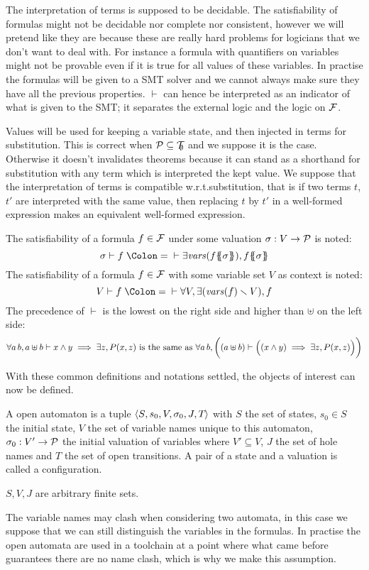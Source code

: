 \documentclass{article}
\begin{document}
The interpretation of terms is supposed to be decidable.
The satisfiability of formulas might not be decidable nor complete nor consistent, however we will pretend like they are because these are really hard problems for logicians that we don't want to deal with.
For instance a formula with quantifiers on variables might not be provable even if it is true for all values of these variables.
In practise the formulas will be given to a SMT solver and we cannot always make sure they have all the previous properties.
\(\vdash\) can hence be interpreted as an indicator of what is given to the SMT; it separates the external logic and the logic on \({\mathcal{F}}\).

Values will be used for keeping a variable state, and then injected in terms for substitution.
This is correct when \(\mathcal{P} \subseteq {\mathcal{T}}_{\!\!\emptyset}\) and we suppose it is the case.
Otherwise it doesn't invalidates theorems because it can stand as a shorthand for substitution with any term which is interpreted the kept value.
We suppose that the interpretation of terms is compatible w.r.t.\@ substitution, that is if two terms \(t\), \(t'\) are interpreted with the same value, then replacing \(t\) by \(t'\) in a well-formed expression makes an equivalent well-formed expression.
\begin{noti}
 The satisfiability of a formula \(f \in {\mathcal{F}}\) under some valuation \(\sigma: V \to \mathcal{P}\) is noted:
\[ \sigma \vdash f \defnotation \vdash \exists \fvars{f\psubst{\sigma}}, f\psubst{\sigma} \]
 The satisfiability of a formula \(f \in {\mathcal{F}}\) with some variable set \(V\) as context is noted:
\[ V \vdash f \defnotation \vdash \forall V, \exists\mpar{\fvars{f} \setminus V}, f \]
 The precedence of \(\vdash\) is the lowest on the right side and higher than \(\uplus\) on the left side:
\[ \forall a \, b, a \uplus b \vdash x \wedge y \implies \exists z, P{\left(x,z\right)} \text{ is the same as } \forall a \, b, \bigg((a \uplus b) \vdash \Big((x \wedge y) \implies \exists z, P{\left(x,z\right)}\Big)\bigg) \]
\end{noti}
With these common definitions and notations settled, the objects of interest can now be defined.
\begin{defi}
A open automaton is a tuple \(\left<S_{},s_{0},V_{},\sigma_{0},J_{},T_{}\right>\) with \(S\) the set of states, \(s_0 \in S\) the initial state, \(V\) the set of variable names unique to this automaton, \(\sigma_0: V' \to \mathcal{P}\) the initial valuation of variables where \(V' \subseteq V\), \(J\) the set of hole names and \(T\) the set of open transitions.
A pair of a state and a valuation is called a configuration.

\(S, V, J\) are arbitrary finite sets. %
\end{defi}
The variable names may clash when considering two automata, in this case we suppose that we can still distinguish the variables in the formulas.
In practise the open automata are used in a toolchain at a point where what came before guarantees there are no name clash, which is why we make this assumption.
\end{document}
